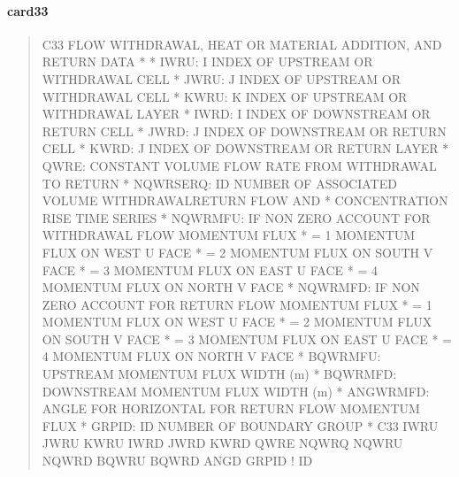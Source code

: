 \documentclass[letterpaper,10pt,english]{sphinxmanual}
\begin{document}
\paragraph{card33}
\label{\detokenize{inputfiles/runcontrol/card33:card33}}\label{\detokenize{inputfiles/runcontrol/card33::doc}}\begin{quote}

\begin{sphinxVerbatim}[commandchars=\\\{\}]
\PYGZhy{}\PYGZhy{}\PYGZhy{}\PYGZhy{}\PYGZhy{}\PYGZhy{}\PYGZhy{}\PYGZhy{}\PYGZhy{}\PYGZhy{}\PYGZhy{}\PYGZhy{}\PYGZhy{}\PYGZhy{}\PYGZhy{}\PYGZhy{}\PYGZhy{}\PYGZhy{}\PYGZhy{}\PYGZhy{}\PYGZhy{}\PYGZhy{}\PYGZhy{}\PYGZhy{}\PYGZhy{}\PYGZhy{}\PYGZhy{}\PYGZhy{}\PYGZhy{}\PYGZhy{}\PYGZhy{}\PYGZhy{}\PYGZhy{}\PYGZhy{}\PYGZhy{}\PYGZhy{}\PYGZhy{}\PYGZhy{}\PYGZhy{}\PYGZhy{}\PYGZhy{}\PYGZhy{}\PYGZhy{}\PYGZhy{}\PYGZhy{}\PYGZhy{}\PYGZhy{}\PYGZhy{}\PYGZhy{}\PYGZhy{}\PYGZhy{}\PYGZhy{}\PYGZhy{}\PYGZhy{}\PYGZhy{}\PYGZhy{}\PYGZhy{}\PYGZhy{}\PYGZhy{}\PYGZhy{}\PYGZhy{}\PYGZhy{}\PYGZhy{}\PYGZhy{}\PYGZhy{}\PYGZhy{}\PYGZhy{}\PYGZhy{}\PYGZhy{}\PYGZhy{}\PYGZhy{}\PYGZhy{}\PYGZhy{}\PYGZhy{}\PYGZhy{}\PYGZhy{}\PYGZhy{}\PYGZhy{}
C33 FLOW WITHDRAWAL, HEAT OR MATERIAL ADDITION, AND RETURN DATA
*
*  IWRU:     I INDEX OF UPSTREAM OR WITHDRAWAL CELL
*  JWRU:     J INDEX OF UPSTREAM OR WITHDRAWAL CELL
*  KWRU:     K INDEX OF UPSTREAM OR WITHDRAWAL LAYER
*  IWRD:     I INDEX OF DOWNSTREAM OR RETURN CELL
*  JWRD:     J INDEX OF DOWNSTREAM OR RETURN CELL
*  KWRD:     J INDEX OF DOWNSTREAM OR RETURN LAYER
*  QWRE:       CONSTANT VOLUME FLOW RATE FROM WITHDRAWAL TO RETURN
*  NQWRSERQ: ID NUMBER OF ASSOCIATED VOLUME WITHDRAWAL\PYGZhy{}RETURN FLOW AND
*               CONCENTRATION RISE TIME SERIES
*  NQWRMFU:  IF NON ZERO ACCOUNT FOR WITHDRAWAL FLOW MOMENTUM FLUX
*            = 1  MOMENTUM FLUX ON WEST U FACE
*            = 2  MOMENTUM FLUX ON SOUTH V FACE
*            = 3  MOMENTUM FLUX ON EAST U FACE
*            = 4  MOMENTUM FLUX ON NORTH V FACE
*  NQWRMFD:   IF NON ZERO ACCOUNT FOR RETURN FLOW MOMENTUM FLUX
*            = 1  MOMENTUM FLUX ON WEST U FACE
*            = 2  MOMENTUM FLUX ON SOUTH V FACE
*            = 3  MOMENTUM FLUX ON EAST U FACE
*            = 4  MOMENTUM FLUX ON NORTH V FACE
*  BQWRMFU:  UPSTREAM MOMENTUM FLUX WIDTH (m)
*  BQWRMFD:  DOWNSTREAM MOMENTUM FLUX WIDTH (m)
*  ANGWRMFD: ANGLE FOR HORIZONTAL FOR RETURN FLOW MOMENTUM FLUX
*  GRPID:    ID NUMBER OF BOUNDARY GROUP
*
C33    IWRU    JWRU    KWRU    IWRD    JWRD    KWRD    QWRE  NQW\PYGZus{}RQ  NQWR\PYGZus{}U  NQWR\PYGZus{}D  BQWR\PYGZus{}U  BQWR\PYGZus{}D   ANG\PYGZus{}D   GRPID ! ID
\end{sphinxVerbatim}
\end{quote}
\end{document}
